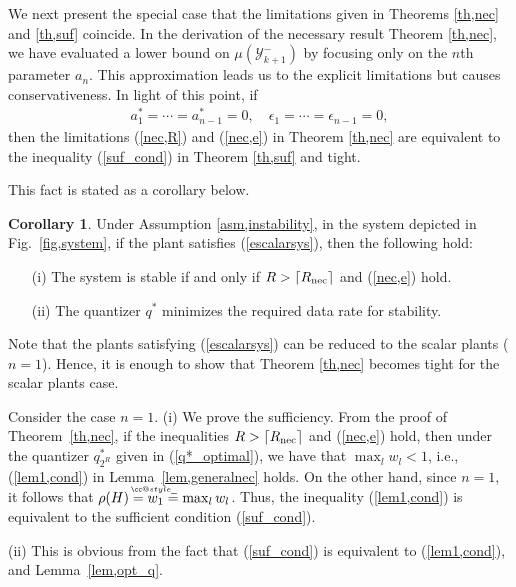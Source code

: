 \documentclass[a4paper, 11pt]{article}
\makeatletter
\def\widebar{\accentset{{\cc@style\underline{\mskip10mu}}}}
\newcommand{\calY}{\mathcal{Y}}
\newcommand{\Rnec}{R_{\textnormal{nec}}}
\theoremstyle{definition}
\newtheorem{cor}{Corollary}
\newenvironment{pf}[1][\proofname]{\par\pushQED{\qed}
 \normalfont\topsep6\p@\@plus6\p@\relax\trivlist\item[\hskip\labelsep\bfseries#1\@addpunct{.}]
 \ignorespaces}{\popQED\endtrivlist\@endpefalse}
\newcommand{\fref}[1]{Fig.~\ref{#1}}
\makeatother
\begin{document}
We next present the special case that the limitations given in Theorems
\ref{th,nec} and \ref{th,suf} coincide.
In the derivation of the necessary result Theorem \ref{th,nec},
we have evaluated a lower bound on $\mu(\calY^-_{k+1})$ by focusing only on
the $n$th parameter $a_{n}$.
This approximation leads us to the explicit limitations but causes conservativeness.
In light of this point, if
\begin{align}
 a_1^*=\cdots=a_{n-1}^*=0,\quad \epsilon_1=\cdots=\epsilon_{n-1}=0,\label{escalarsys}
\end{align}
then the limitations (\ref{nec,R}) and (\ref{nec,e}) in Theorem \ref{th,nec}
are equivalent to the inequality (\ref{suf_cond}) in Theorem \ref{th,suf} and tight.

This fact is stated as a corollary below.
\begin{cor}\label{cor,scalar}
 Under Assumption \ref{asm,instability}, in the system depicted in \fref{fig,system},
if the plant satisfies (\ref{escalarsys}), then the following hold:
\begin{itemize}
 \item[(i)]  The system is stable if and only if  $R>\lceil \Rnec\rceil$
	     and (\ref{nec,e}) hold.
\item[(ii)] The quantizer $q^*$ minimizes the required data rate for
stability.
\end{itemize}
\end{cor}

Note that the plants satisfying (\ref{escalarsys}) can be reduced to the scalar
plants ($n=1$).
Hence, it is enough to show that Theorem \ref{th,nec} becomes tight
for the scalar plants case.

\begin{pf}
Consider the case $n=1$.
(i) We prove the sufficiency.
From the proof of Theorem~\ref{th,nec}, if the inequalities $R>\lceil \Rnec\rceil$
and (\ref{nec,e}) hold, then under the quantizer $q^*_{2^R}$ given in (\ref{q*_optimal}),
we have that $\max_l w_l<1$, i.e., (\ref{lem1,cond}) in Lemma~\ref{lem,generalnec}
holds.
On the other hand, since $n=1$, it follows that $\rho(H)=\widebar w_1=\max_lw_l$.
Thus, the inequality (\ref{lem1,cond}) is equivalent to the sufficient condition
(\ref{suf_cond}).

(ii) This is obvious from the fact that (\ref{suf_cond}) is equivalent
to (\ref{lem1,cond}), and Lemma~\ref{lem,opt_q}.
\end{pf}
\end{document}
